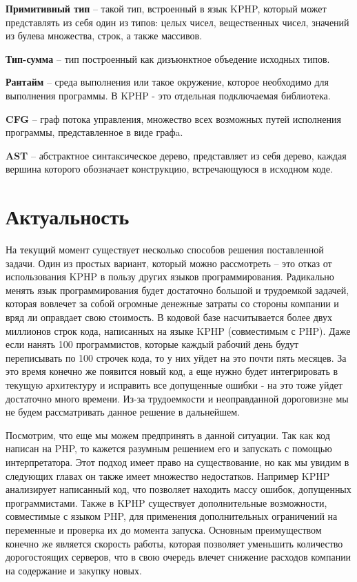 \textbf{Примитивный тип} -- такой тип, встроенный в язык KPHP, который может представлять из себя один из типов: целых чисел, вещественных чисел, значений из булева множества, строк, а также массивов.

\textbf{Тип-сумма} -- тип построенный как дизъюнктное объедение исходных типов.

\textbf{Рантайм} -- среда выполнения или такое окружение, которое необходимо для выполнения программы. В KPHP - это отдельная подключаемая библиотека.

\textbf{CFG} -- граф потока управления, множество всех возможных путей исполнения программы, представленное в виде графa.

\textbf{AST} -- абстрактное синтаксическое дерево, представляет из себя дерево, каждая вершина которого обозначает конструкцию, встречающуюся в исходном коде.

\section{Актуальность}
На текущий момент существует несколько способов решения поставленной задачи. Один из простых вариант, который можно рассмотреть -- это отказ от использования KPHP в пользу других языков программирования. 
Радикально менять язык программирования будет достаточно большой и трудоемкой задачей, которая вовлечет за собой огромные денежные затраты со стороны компании и вряд ли оправдает свою стоимость. 
В кодовой базе насчитывается более двух миллионов строк кода, написанных на языке KPHP (совместимым с PHP).
Даже если нанять 100 программистов, которые каждый рабочий день будут переписывать по 100 строчек кода, то у них уйдет на это почти пять месяцев. За это время конечно же появится новый код, а еще нужно будет интегрировать в текущую архитектуру и исправить все допущенные ошибки - на это тоже уйдет достаточно много времени.
Из-за трудоемкости и неоправданной дороговизне мы не будем рассматривать данное решение в дальнейшем.

Посмотрим, что еще мы можем предпринять в данной ситуации. 
Так как код написан на PHP, то кажется разумным решением его и запускать с помощью интерпретатора. 
Этот подход имеет право на существование, но как мы увидим в следующих главах он также имеет множество недостатков.
Например KPHP анализирует написанный код, что позволяет находить массу ошибок, допущенных программистами.
Также в KPHP существует дополнительные возможности, совместимые с языком PHP, для применения дополнительных ограничений на переменные и проверка их до момента запуска.
Основным преимуществом конечно же является скорость работы, которая позволяет уменьшить количество дорогостоящих серверов, что в свою очередь влечет снижение расходов компании на содержание и закупку новых.

